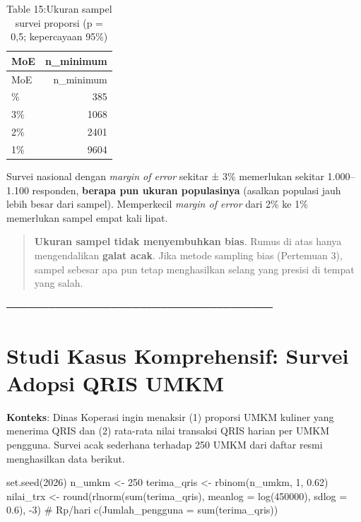\documentclass[
  indonesian,
  letterpaper,
]{book}
\newenvironment{Shaded}{\begin{snugshade}}{\end{snugshade}}
\newcommand{\AttributeTok}[1]{\textcolor[rgb]{0.40,0.45,0.13}{#1}}
\newcommand{\CommentTok}[1]{\textcolor[rgb]{0.37,0.37,0.37}{#1}}
\newcommand{\DecValTok}[1]{\textcolor[rgb]{0.68,0.00,0.00}{#1}}
\newcommand{\FloatTok}[1]{\textcolor[rgb]{0.68,0.00,0.00}{#1}}
\newcommand{\FunctionTok}[1]{\textcolor[rgb]{0.28,0.35,0.67}{#1}}
\newcommand{\NormalTok}[1]{\textcolor[rgb]{0.00,0.23,0.31}{#1}}
\newcommand{\OtherTok}[1]{\textcolor[rgb]{0.00,0.23,0.31}{#1}}
\newcommand{\SpecialCharTok}[1]{\textcolor[rgb]{0.37,0.37,0.37}{#1}}
\begin{document}
\begin{longtable}[]{@{}lr@{}}
\caption{Table 15:Ukuran sampel survei proporsi (p = 0,5; kepercayaan
95\%)}\tabularnewline
\toprule\noalign{}
MoE & n\_minimum \\
\midrule\noalign{}
\endfirsthead
\toprule\noalign{}
MoE & n\_minimum \\
\midrule\noalign{}
\endhead
\bottomrule\noalign{}
\endlastfoot
5\% & 385 \\
3\% & 1068 \\
2\% & 2401 \\
1\% & 9604 \\
\end{longtable}

Survei nasional dengan \emph{margin of error} sekitar ± 3\% memerlukan
sekitar 1.000--1.100 responden, \textbf{berapa pun ukuran populasinya}
(asalkan populasi jauh lebih besar dari sampel). Memperkecil
\emph{margin of error} dari 2\% ke 1\% memerlukan sampel empat kali
lipat.

\begin{quote}
\textbf{Ukuran sampel tidak menyembuhkan bias}. Rumus di atas hanya
mengendalikan \textbf{galat acak}. Jika metode sampling bias (Pertemuan
3), sampel sebesar apa pun tetap menghasilkan selang yang presisi di
tempat yang salah.
\end{quote}

──────────────────────────────────────

\section{Studi Kasus Komprehensif: Survei Adopsi QRIS
UMKM}\label{studi-kasus-komprehensif-survei-adopsi-qris-umkm}

\textbf{Konteks}: Dinas Koperasi ingin menaksir (1) proporsi UMKM
kuliner yang menerima QRIS dan (2) rata-rata nilai transaksi QRIS harian
per UMKM pengguna. Survei acak sederhana terhadap 250 UMKM dari daftar
resmi menghasilkan data berikut.

\begin{Shaded}
\begin{Highlighting}[]
\FunctionTok{set.seed}\NormalTok{(}\DecValTok{2026}\NormalTok{)}
\NormalTok{n\_umkm }\OtherTok{\textless{}{-}} \DecValTok{250}
\NormalTok{terima\_qris }\OtherTok{\textless{}{-}} \FunctionTok{rbinom}\NormalTok{(n\_umkm, }\DecValTok{1}\NormalTok{, }\FloatTok{0.62}\NormalTok{)}
\NormalTok{nilai\_trx }\OtherTok{\textless{}{-}} \FunctionTok{round}\NormalTok{(}\FunctionTok{rlnorm}\NormalTok{(}\FunctionTok{sum}\NormalTok{(terima\_qris), }\AttributeTok{meanlog =} \FunctionTok{log}\NormalTok{(}\DecValTok{450000}\NormalTok{), }\AttributeTok{sdlog =} \FloatTok{0.6}\NormalTok{),}
\SpecialCharTok{{-}}\DecValTok{3}\NormalTok{) }\CommentTok{\# Rp/hari}
\FunctionTok{c}\NormalTok{(}\AttributeTok{Jumlah\_pengguna =} \FunctionTok{sum}\NormalTok{(terima\_qris))}
\end{Highlighting}
\end{Shaded}
\end{document}
